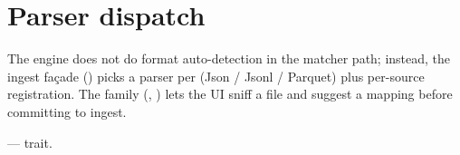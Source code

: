 \section{Parser dispatch}

The engine does not do format auto-detection in the matcher path;
instead, the ingest façade () picks a
parser per  (Json / Jsonl / Parquet) plus
per-source registration. The  family
(,
) lets the UI sniff a file and suggest
a mapping before committing to ingest.

\begin{inthecode}
 --- 
trait.
\end{inthecode}
